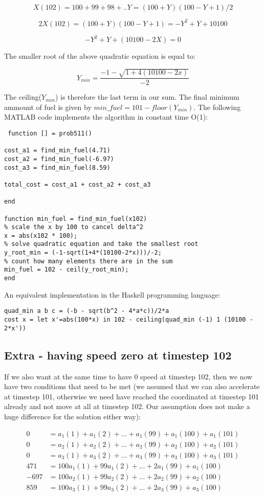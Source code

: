 \documentclass[11pt,a4paper,oneside]{report}
\begin{document}
$$X(102) = 100 + 99 + 98 + .. Y = (100+Y)(100-Y+1)/2$$

$$2X(102) = (100+Y)(100-Y+1) = -Y^2 + Y + 10100$$

$$-Y^2 + Y + (10100 - 2X) = 0$$

The smaller root of the above quadratic equation is equal to:

$$Y_{min} = \frac{-1-\sqrt{1+4(10100-2x)}}{-2}$$

The ceiling($Y_{min}$) is therefore the last term in our sum. The final minimum ammount of fuel is given by $min\_fuel = 101 - floor(Y_{min})$. The following MATLAB code implements the algorithm in constant time O(1):

\begin{lstlisting}
 function [] = prob511()

cost_a1 = find_min_fuel(4.71)
cost_a2 = find_min_fuel(-6.97)
cost_a3 = find_min_fuel(8.59)

total_cost = cost_a1 + cost_a2 + cost_a3

end

function min_fuel = find_min_fuel(x102)
% scale the x by 100 to cancel delta^2
x = abs(x102 * 100);
% solve quadratic equation and take the smallest root
y_root_min = (-1-sqrt(1+4*(10100-2*x)))/-2;
% count how many elements there are in the sum
min_fuel = 102 - ceil(y_root_min);
end
\end{lstlisting}

An equivalent implementation in the Haskell programming language:

\begin{lstlisting}
quad_min a b c = (-b - sqrt(b^2 - 4*a*c))/2*a
cost x = let x'=abs(100*x) in 102 - ceiling(quad_min (-1) 1 (10100 - 2*x'))
\end{lstlisting}


\subsection*{Extra - having speed zero at timestep 102}

If we also want at the same time to have 0 speed at timestep 102, then we now have two conditions that need to be met (we assumed that we can also accelerate at timestep 101, otherwise we need have reached the coordinated at timestep 101 already and not move at all at timestep 102. Our assumption does not make a huge difference for the solution either way):

\begin{align*}
0 &= a_1(1)+a_1(2)+...+a_1(99)+a_1(100)+a_1(101)\\
0 &= a_2(1)+a_2(2)+...+a_2(99)+a_2(100)+a_2(101)\\
0 &= a_3(1)+a_3(2)+...+a_3(99)+a_3(100)+a_3(101)\\
471 &= 100a_1(1)+99a_1(2)+...+2a_1(99)+a_1(100)\\
-697 &= 100a_2(1)+99a_2(2)+...+2a_2(99)+a_2(100)\\
859 &= 100a_3(1)+99a_3(2)+...+2a_3(99)+a_3(100)\\
\end{align*}
\end{document}
